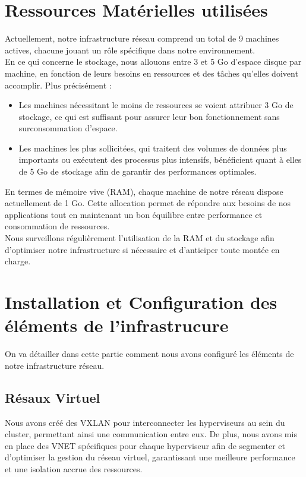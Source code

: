 \documentclass{article}
\begin{document}
\clearpage

\section{Ressources Matérielles utilisées}
Actuellement, notre infrastructure réseau comprend un total de 9 machines actives, chacune jouant un rôle spécifique dans notre environnement.
\\

En ce qui concerne le stockage, nous allouons entre 3 et 5 Go d’espace disque par machine, en fonction de leurs besoins en ressources et des tâches qu’elles doivent accomplir. Plus précisément :
\begin{itemize}
    \item Les machines nécessitant le moins de ressources se voient attribuer 3 Go de stockage, ce qui est suffisant pour assurer leur bon fonctionnement sans surconsommation d’espace.
    \item Les machines les plus sollicitées, qui traitent des volumes de données plus importants ou exécutent des processus plus intensifs, bénéficient quant à elles de 5 Go de stockage afin de garantir des performances optimales.
\end{itemize}

En termes de mémoire vive (RAM), chaque machine de notre réseau dispose actuellement de 1 Go. Cette allocation permet de répondre aux besoins de nos applications tout en maintenant un bon équilibre entre performance et consommation de ressources.
\\

Nous surveillons régulièrement l’utilisation de la RAM et du stockage afin d’optimiser notre infrastructure si nécessaire et d’anticiper toute montée en charge.

\section{Installation et Configuration des éléments de l'infrastrucure}
On va détailler dans cette partie comment nous avons configuré les éléments de notre infrastructure réseau.
\subsection{Résaux Virtuel}

Nous avons créé des VXLAN pour interconnecter les hyperviseurs au sein du cluster, permettant ainsi une communication entre eux. De plus, nous avons mis en place des VNET spécifiques pour chaque hyperviseur afin de segmenter et d’optimiser la gestion du réseau virtuel, garantissant une meilleure performance et une isolation accrue des ressources.
\end{document}
